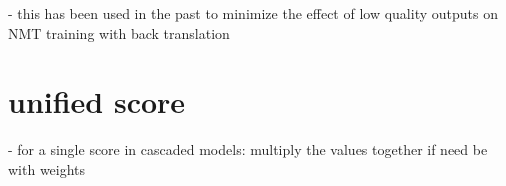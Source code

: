 - this has been used in the past to minimize the effect of low quality outputs on NMT training with back translation \cite{wang-etal-2018-alibaba} 

\section{unified score}
- for a single score in cascaded models: multiply the values together if need be with weights 
